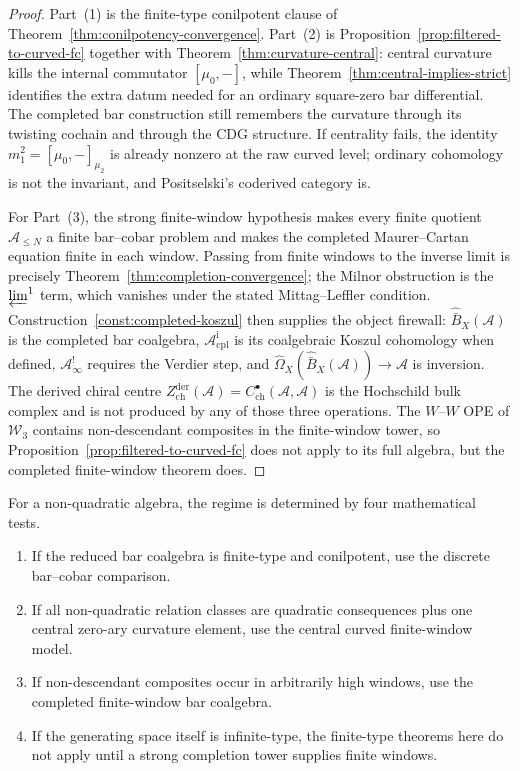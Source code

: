 \begin{proof}
Part~(1) is the finite-type conilpotent clause of
Theorem~\ref{thm:conilpotency-convergence}.  Part~(2) is
Proposition~\ref{prop:filtered-to-curved-fc} together with
Theorem~\ref{thm:curvature-central}: central curvature kills the
internal commutator $[\mu_0,-]$, while
Theorem~\ref{thm:central-implies-strict} identifies the extra datum
needed for an ordinary square-zero bar differential.  The completed
bar construction still remembers the curvature through its twisting
cochain and through the CDG structure.  If centrality fails, the
identity $m_1^2=[\mu_0,-]_{\mu_2}$ is already nonzero at the raw
curved level; ordinary cohomology is not the invariant, and
Positselski's coderived category is.

For Part~(3), the strong finite-window hypothesis makes every finite
quotient $\mathcal A_{\le N}$ a finite bar--cobar problem and makes
the completed Maurer--Cartan equation finite in each window.  Passing
from finite windows to the inverse limit is precisely
Theorem~\ref{thm:completion-convergence}; the Milnor obstruction is
the $\varprojlim^1$ term, which vanishes under the stated
Mittag--Leffler condition.  Construction~\ref{const:completed-koszul}
then supplies the object firewall:
$\widehat{\bar B}_X(\mathcal A)$ is the completed bar coalgebra,
$\mathcal A^{\mathrm i}_{\mathrm{cpl}}$ is its coalgebraic Koszul
cohomology when defined, $\mathcal A^!_\infty$ requires the Verdier
step, and $\widehat\Omega_X(\widehat{\bar B}_X(\mathcal A))\to
\mathcal A$ is inversion.  The derived chiral centre
$Z^{\mathrm{der}}_{\mathrm{ch}}(\mathcal A)
=C^\bullet_{\mathrm{ch}}(\mathcal A,\mathcal A)$ is the Hochschild
bulk complex and is not produced by any of those three operations.  The
$W$--$W$ OPE of $\mathcal W_3$
contains non-descendant composites in the finite-window tower, so
Proposition~\ref{prop:filtered-to-curved-fc} does not apply to its
full algebra, but the completed finite-window theorem does.
\end{proof}

\begin{remark}\label{rem:regime-criterion-fc}
For a non-quadratic algebra, the regime is determined by four
mathematical tests.
\begin{enumerate}
\item If the reduced bar coalgebra is finite-type and conilpotent, use
the discrete bar--cobar comparison.
\item If all non-quadratic relation classes are quadratic consequences
plus one central zero-ary curvature element, use the central curved
finite-window model.
\item If non-descendant composites occur in arbitrarily high windows,
use the completed finite-window bar coalgebra.
\item If the generating space itself is infinite-type, the finite-type
theorems here do not apply until a strong completion tower supplies
finite windows.
\end{enumerate}
\end{remark}
